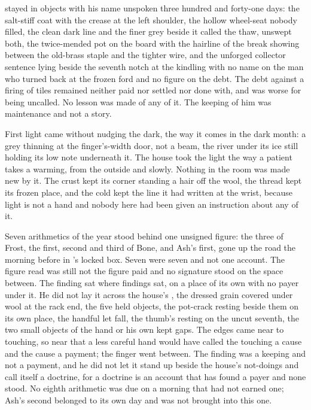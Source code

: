  stayed in objects with his name unspoken three hundred and forty-one days: the salt-stiff coat with the crease at the left shoulder, the hollow wheel-seat nobody filled, the clean dark line and the finer grey beside it called the thaw, unswept both, the twice-mended pot on the board with the hairline of the break showing between the old-brass staple and the tighter wire, and the unforged collector sentence lying beside the seventh notch at the kindling with no name on the man who turned back at the frozen ford and no figure on the debt. The debt against a firing of tiles remained neither paid nor settled nor done with, and was worse for being uncalled. No lesson was made of any of it. The keeping of him was maintenance and not a story.

First light came without nudging the dark, the way it comes in the dark month: a grey thinning at the finger's-width door, not a beam, the river under its ice still holding its low note underneath it. The house took the light the way a patient takes a warming, from the outside and slowly. Nothing in the room was made new by it. The crust kept its corner standing a hair off the wool, the thread kept its frozen place, and the cold kept the line it had written at the wrist, because light is not a hand and nobody here had been given an instruction about any of it.

\scenebreak

Seven arithmetics of the year stood behind one unsigned figure: the three of Frost, the first, second and third of Bone, and Ash's first, gone up the road the morning before in 's locked box. Seven were seven and not one account. The figure read was still not the figure paid and no signature stood on the space between. The finding sat where findings sat, on a place of its own with no payer under it. He did not lay it across the house's , the dressed grain covered under wool at the rack end, the five held objects, the pot-crack resting beside them on its own place, the handful let fall, the thumb's resting on the uncut seventh, the two small objects of the hand or his own kept gaps. The edges came near to touching, so near that a less careful hand would have called the touching a cause and the cause a payment; the finger went between. The finding was a keeping and not a payment, and he did not let it stand up beside the house's not-doings and call itself a doctrine, for a doctrine is an account that has found a payer and none stood. No eighth arithmetic was due on a morning that had not earned one; Ash's second belonged to its own day and was not brought into this one.

